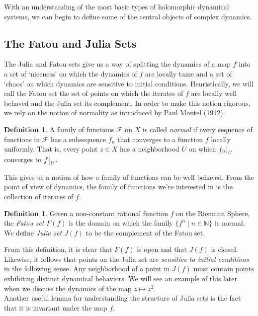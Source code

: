 \documentclass{amsart}
\newcommand{\bbN}{\mathbb{N}}
\newcommand{\cal}[1]{ \mathcal{#1}}
\newcommand\restr[2]{{%
  \left.\kern-\nulldelimiterspace %
  #1 %
  \vphantom{\big|} %
  \right|_{#2} %
  }}
\theoremstyle{definition}
\newtheorem{defn}[thm]{Definition}
\theoremstyle{remark}
\numberwithin{equation}{section}
\begin{document}
With an understanding of the most basic types of holomorphic dynamical systems, we can begin to define some of the central objects of complex dynamics.

\subsection{The Fatou and Julia Sets}

The Julia and Fatou sets give us a way of splitting the dynamics of a map $f$ into a set of `niceness' on which the dynamics of $f$ are locally tame and a set of `chaos' on which dynamics are sensitive to initial conditions. Heuristically, we will call the Fatou set the set of points on which the iterates of $f$ are locally well behaved and the Julia set its complement. In order to make this notion rigorous, we rely on the notion of normality as introduced by Paul Montel (1912). %

\begin{defn}
A family of functions $\cal{F}$ on $X$ is called \emph{normal} if every sequence of functions in $\cal{F}$ has a subsequence $f_n$ that converges to a function $f$ locally uniformly. That is, every point $z\in X$ has a neighborhood $U$ on which  $\restr{f_n}{U}$ converges to $\restr{f}{U}$.
\end{defn}

This gives us a notion of how a family of functions can be well behaved. From the point of view of dynamics, the family of functions we're interested in is the collection of iterates of $f$.

\begin{defn}
  Given a non-constant rational function $f$ on the Riemann Sphere, the \emph{Fatou set} $F(f)$ is the domain on which the family $\{f^n\mid n\in\bbN\}$ is normal. We define \emph{Julia set} $J(f)$ to be the complement of the Fatou set.
\end{defn}

From this definition, it is clear that $F(f)$ is open and that $J(f)$ is closed. Likewise, it follows that points on the Julia set are \emph{sensitive to initial conditions} in the following sense. Any neighborhood of a point in $J(f)$ must contain points exhibiting distinct dynamical behaviors. We will see an example of this later when we discuss the dynamics of the map $z\mapsto z^2$.\\

Another useful lemma for understanding the structure of Julia sets is the fact that it is invariant under the map $f$.
\end{document}
